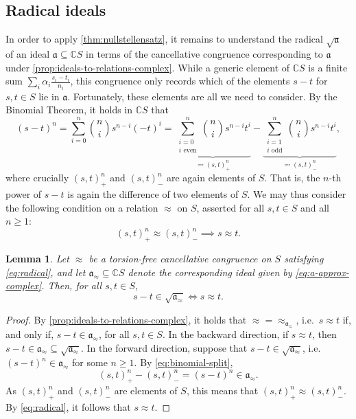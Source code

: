 \documentclass[11pt]{scrartcl}
\theoremstyle{definition}
\theoremstyle{plain}
\newtheorem{lemma}[definition]{Lemma}
\theoremstyle{remark}
\begin{document}
	\subsection{Radical ideals}
	\label{sec:radical-ideals}

	In order to apply \cref{thm:nullstellensatz},
	it remains to understand the radical $\sqrt{\mathfrak{a}}$ of an ideal $\mathfrak{a} \subseteq \mathbb{C}S$
	in terms of the cancellative congruence corresponding to $\mathfrak{a}$ under \cref{prop:ideals-to-relations-complex}.
	While a generic element of $\mathbb{C}S$ is a finite sum $\sum_i \alpha_i \frac{s_i - t_i}{n_i}$,
	this congruence only records which of the elements $s - t$ for $s, t\in S$ lie in $\mathfrak{a}$.
	Fortunately, these elements are all we need to consider.
	By the Binomial Theorem, it holds in $\mathbb{C}S$ that
	\begin{equation}\label{eq:binomial-split}
	(s-t)^n 
	= \sum_{i=0}^n \binom{n}{i} s^{n-i} (-t)^i 
	= \underbrace{\sum_{\substack{i=0 \\ i \text{ even}}}^n \binom{n}{i} s^{n-i} t^i}_{\eqqcolon (s, t)^n_+}
	- \underbrace{\sum_{\substack{i=1 \\ i \text{ odd}}}^n \binom{n}{i} s^{n-i} t^i}_{\eqqcolon (s,t)^n_-},
	\end{equation}
	where crucially $(s, t)^n_+$ and $(s,t)^n_-$ are again elements of $S$.
	That is, the $n$-th power of $s - t$ is again the difference of two elements of $S$.
	We may thus consider the following condition on a relation $\approx$ on $S$,
	asserted for all $s,t \in S$ and all $n \geq 1$:
	\begin{equation}\label{eq:radical}
		(s, t)^n_+ \approx (s,t)^n_- \implies s \approx t.
	\end{equation}

	\begin{lemma}\label{lem:radical-differences}
		Let $\approx$ be a torsion-free cancellative congruence on $S$
		satisfying \eqref{eq:radical},
		and let $\mathfrak{a}_{\approx} \subseteq \mathbb{C}S$ denote the corresponding ideal
		given by \cref{eq:a-approx-complex}.
		Then, for all $s, t \in S$,
		\[
			s - t \in \sqrt{\mathfrak{a}_{\approx}} \iff s \approx t.
		\]
	\end{lemma}
	\begin{proof}
		By \cref{prop:ideals-to-relations-complex},
		it holds that ${\approx} = {\approx_{\mathfrak{a}_{\approx}}}$,
		i.e.\ $s \approx t$ if, and only if, $s - t \in \mathfrak{a}_{\approx}$, for all $s, t \in S$.
		In the backward direction,
		if $s \approx t$, then $s - t \in \mathfrak{a}_{\approx} \subseteq \sqrt{\mathfrak{a}_{\approx}}$.
		In the forward direction,
		suppose that $s - t \in \sqrt{\mathfrak{a}_{\approx}}$,
		i.e.\ $(s-t)^n \in \mathfrak{a}_{\approx}$ for some $n \geq 1$.
		By \eqref{eq:binomial-split},
		\[
			(s, t)^n_+ - (s,t)^n_- = (s-t)^n \in \mathfrak{a}_{\approx}.
		\]
		As $(s, t)^n_+$ and $(s,t)^n_-$ are elements of $S$,
		this means that $(s, t)^n_+ \approx (s,t)^n_-$.
		By \eqref{eq:radical}, it follows that $s \approx t$.
	\end{proof}
\end{document}
